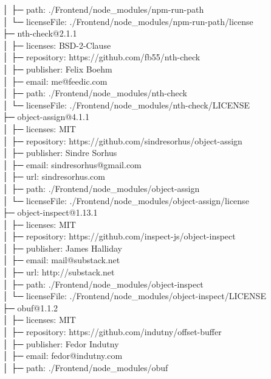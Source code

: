 \documentclass[
    paper=a4,
    twoside=false,
    parskip=half,
    listof=entryprefix,
    listof=totoc,
    index=totoc,
    bibliography=totoc,
    headsepline,
]{scrbook}
\begin{document}
    │  ├─ path: ./Frontend/node\_modules/npm-run-path\\
    │  └─ licenseFile: ./Frontend/node\_modules/npm-run-path/license\\
    ├─ nth-check@2.1.1\\
    │  ├─ licenses: BSD-2-Clause\\
    │  ├─ repository: https://github.com/fb55/nth-check\\
    │  ├─ publisher: Felix Boehm\\
    │  ├─ email: me@feedic.com\\
    │  ├─ path: ./Frontend/node\_modules/nth-check\\
    │  └─ licenseFile: ./Frontend/node\_modules/nth-check/LICENSE\\
    ├─ object-assign@4.1.1\\
    │  ├─ licenses: MIT\\
    │  ├─ repository: https://github.com/sindresorhus/object-assign\\
    │  ├─ publisher: Sindre Sorhus\\
    │  ├─ email: sindresorhus@gmail.com\\
    │  ├─ url: sindresorhus.com\\
    │  ├─ path: ./Frontend/node\_modules/object-assign\\
    │  └─ licenseFile: ./Frontend/node\_modules/object-assign/license\\
    ├─ object-inspect@1.13.1\\
    │  ├─ licenses: MIT\\
    │  ├─ repository: https://github.com/inspect-js/object-inspect\\
    │  ├─ publisher: James Halliday\\
    │  ├─ email: mail@substack.net\\
    │  ├─ url: http://substack.net\\
    │  ├─ path: ./Frontend/node\_modules/object-inspect\\
    │  └─ licenseFile: ./Frontend/node\_modules/object-inspect/LICENSE\\
    ├─ obuf@1.1.2\\
    │  ├─ licenses: MIT\\
    │  ├─ repository: https://github.com/indutny/offset-buffer\\
    │  ├─ publisher: Fedor Indutny\\
    │  ├─ email: fedor@indutny.com\\
    │  ├─ path: ./Frontend/node\_modules/obuf\\
\end{document}
